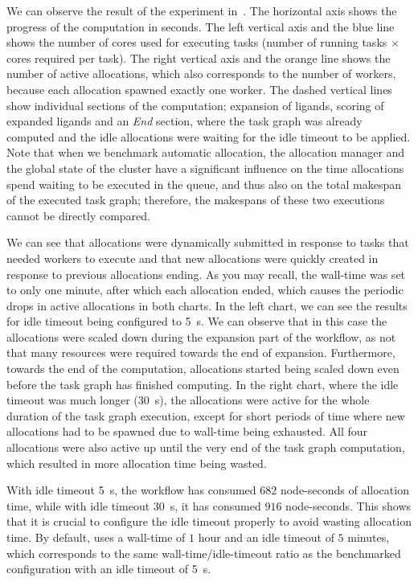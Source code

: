 We can observe the result of the experiment in~. The horizontal axis shows
the progress of the computation in seconds. The left vertical axis and the blue line shows the
number of cores used for executing tasks (number of running tasks $\times$ cores
required per task). The right vertical axis and the orange line shows the number of active
allocations, which also corresponds to the number of workers, because each allocation spawned
exactly one worker. The dashed vertical lines show individual sections of the computation;
expansion of ligands, scoring of expanded ligands and an \emph{End} section, where the
task graph was already computed and the idle allocations were waiting for the idle timeout to be
applied. Note that when we benchmark automatic allocation, the allocation manager and the global
state of the cluster have a significant influence on the time allocations spend waiting to be
executed in the queue, and thus also on the total makespan of the executed task graph; therefore,
the makespans of these two executions cannot be directly compared.

We can see that allocations were dynamically submitted in response to tasks that needed workers to
execute and that new allocations were quickly created in response to previous allocations ending.
As you may recall, the wall-time was set to only one minute, after which each allocation ended,
which causes the periodic drops in active allocations in both charts. In the left chart, we can see
the results for idle timeout being configured to \SI{5}{\second}. We can observe that in
this case the allocations were scaled down during the expansion part of the workflow, as not that
many resources were required towards the end of expansion. Furthermore, towards the end of the
computation, allocations started being scaled down even before the task graph has finished
computing. In the right chart, where the idle timeout was much longer (\SI{30}{\second}),
the allocations were active for the whole duration of the task graph execution, except for short
periods of time where new allocations had to be spawned due to wall-time being exhausted. All four
allocations were also active up until the very end of the task graph computation, which resulted in
more allocation time being wasted.

With idle timeout \SI{5}{\second}, the workflow has consumed $682$
node-seconds of allocation time, while with idle timeout \SI{30}{\second}, it has consumed
$916$ node-seconds. This shows that it is crucial to configure the idle timeout
properly to avoid wasting allocation time. By default, \hyperqueue{} uses a wall-time of
$1$ hour and an idle timeout of $5$ minutes, which
corresponds to the same wall-time/idle-timeout ratio as the benchmarked configuration with an idle
timeout of \SI{5}{\second}.

